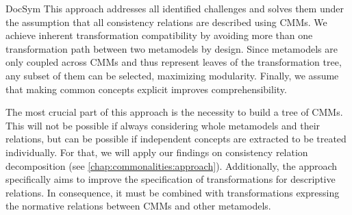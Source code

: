 \begin{copiedFrom}{DocSym}
This approach addresses all identified challenges %
and solves them under the assumption that all consistency relations %
are described using \glspl{CMM}. %
We achieve inherent transformation compatibility by avoiding more than one transformation path %
between two metamodels by design. %
Since metamodels are only coupled across \glspl{CMM} and thus represent leaves of the transformation tree, any subset of them can be selected, maximizing modularity. %
Finally, we assume that making common concepts explicit improves comprehensibility.

The most crucial part of this approach is the necessity to build a tree of \glspl{CMM}.
This will not be possible if always considering whole metamodels and their relations, but can be possible if independent concepts are extracted to be treated individually.
For that, we will apply our findings on consistency relation decomposition (see \autoref{chap:commonalities:approach}).
Additionally, the approach specifically aims to improve the specification of transformations for descriptive relations.
In consequence, it must be combined with transformations expressing the normative relations between \glspl{CMM} and other metamodels.


\end{copiedFrom}
